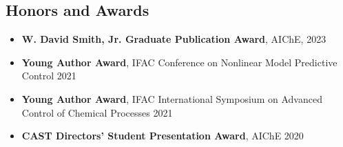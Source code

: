 \documentclass[letterpaper, 11pt]{article}
\begin{document}
\subsection*{Honors and Awards}
\begin{itemize}[leftmargin=*,itemsep=0pt]
\item[] {\bf W. David Smith, Jr. Graduate Publication Award}, AIChE, \hfill 2023
\item[] {\bf Young Author Award}, IFAC Conference on Nonlinear Model Predictive Control \hfill 2021
\item[] {\bf Young Author Award}, IFAC International Symposium on Advanced Control of Chemical Processes \hfill 2021
\item[] {\bf CAST Directors' Student Presentation Award}, AIChE \hfill 2020

\end{itemize}
\end{document}
